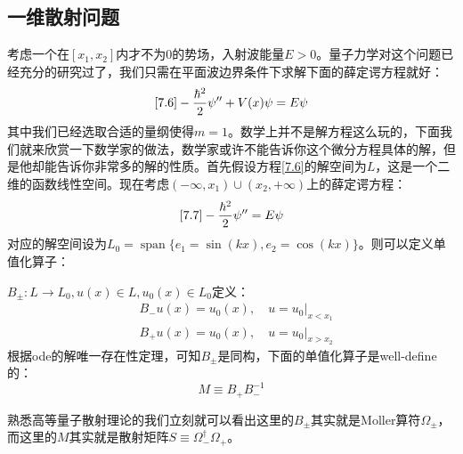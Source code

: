\subsection{一维散射问题}
考虑一个在$[x_1,x_2]$内才不为0的势场，入射波能量$E>0$。量子力学对这个问题已经充分的研究过了，我们只需在平面波边界条件下求解下面的薛定谔方程就好：
\begin{equation}\ref{7.6}
	-\frac{\hbar^2}{2}\psi^{\prime\prime}+V(x)\psi= E\psi
\end{equation}
其中我们已经选取合适的量纲使得$m=1$。数学上并不是解方程这么玩的，下面我们就来欣赏一下数学家的做法，数学家或许不能告诉你这个微分方程具体的解，但是他却能告诉你非常多的解的性质。首先假设方程\ref{7.6}的解空间为$L$，这是一个二维的函数线性空间。现在考虑$(-\infty,x_1)\cup(x_2,+\infty)$上的薛定谔方程：
\begin{equation}\ref{7.7}
	-\frac{\hbar^2}{2}\psi^{\prime\prime}= E\psi
\end{equation}
对应的解空间设为$L_0=\operatorname{span}\{e_1=\sin(kx),e_2=\cos(kx)\}$。则可以定义单值化算子：
\begin{definition}[单值化算子]
	$B_{\pm}:L\to L_0,u(x)\in L,u_0(x)\in L_0$定义：
	\begin{equation}
		\begin{aligned}
			&B_- u (x)=u_0(x),\quad \left.u=u_0\right|_{x<x_1}\\
			&B_+ u (x)=u_0(x),\quad \left.u=u_0\right|_{x>x_2}
		\end{aligned}
	\end{equation}
	根据ode的解唯一存在性定理，可知$B_{\pm}$是同构，下面的单值化算子是well-define的：
	\begin{equation}
		M\equiv B_+B_-^{-1}
	\end{equation}
\end{definition}
熟悉高等量子散射理论的我们立刻就可以看出这里的$B_{\pm}$其实就是Moller算符$\Omega_{\pm}$，而这里的$M$其实就是散射矩阵$S\equiv\Omega_-^\dagger\Omega_+$。

